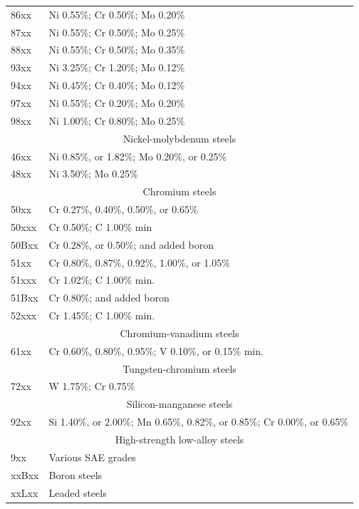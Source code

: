 \documentclass[
10pt,
a4paper,
openany,
svgnames,
]{book}
\begin{document}
\begin{table}[H]
\begin{tabular}{ll}
    86xx & Ni 0.55\%; Cr 0.50\%; Mo 0.20\% \\
    87xx & Ni 0.55\%; Cr 0.50\%; Mo 0.25\% \\
    88xx & Ni 0.55\%; Cr 0.50\%; Mo 0.35\% \\
    93xx & Ni 3.25\%; Cr 1.20\%; Mo 0.12\% \\
    94xx & Ni 0.45\%; Cr 0.40\%; Mo 0.12\% \\
    97xx & Ni 0.55\%; Cr 0.20\%; Mo 0.20\% \\
    98xx & Ni 1.00\%; Cr 0.80\%; Mo 0.25\% \\
    \multicolumn{2}{c}{Nickel-molybdenum steels} \\
    46xx & Ni 0.85\%, or 1.82\%; Mo 0.20\%, or 0.25\% \\
    48xx & Ni 3.50\%; Mo 0.25\% \\
    \multicolumn{2}{c}{Chromium steels} \\
    50xx & Cr 0.27\%, 0.40\%, 0.50\%, or 0.65\% \\
    50xxx & Cr 0.50\%; C 1.00\% min \\
    50Bxx & Cr 0.28\%, or 0.50\%; and added boron \cite{bringas2004handbook} \\
    51xx & Cr 0.80\%, 0.87\%, 0.92\%, 1.00\%, or 1.05\% \\
    51xxx & Cr 1.02\%; C 1.00\% min. \\
    51Bxx & Cr 0.80\%; and added boron \cite{bringas2004handbook} \\
    52xxx & Cr 1.45\%; C 1.00\% min. \\
    \multicolumn{2}{c}{Chromium-vanadium steels} \\
    61xx & Cr 0.60\%, 0.80\%, 0.95\%; V 0.10\%, or 0.15\% min. \\
    \multicolumn{2}{c}{Tungsten-chromium steels} \\
    72xx & W 1.75\%; Cr 0.75\% \\
    \multicolumn{2}{c}{Silicon-manganese steels} \\
    92xx & Si 1.40\%, or 2.00\%; Mn 0.65\%, 0.82\%, or 0.85\%; Cr 0.00\%, or 0.65\% \\
    \multicolumn{2}{c}{High-strength low-alloy steels} \\
    9xx & Various SAE grades \\
    xxBxx & Boron steels \\
    xxLxx & Leaded steels \\
    \bottomrule
  \end{tabular}
\end{table}
\end{document}
